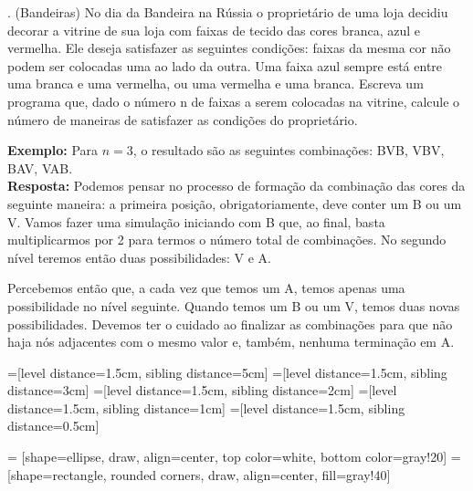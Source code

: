 
. (Bandeiras) No dia da Bandeira na Rússia o proprietário de uma loja decidiu decorar a vitrine de sua loja com faixas de tecido das cores branca, azul e vermelha. Ele deseja satisfazer as seguintes condições: faixas da mesma cor não podem ser colocadas uma ao lado da outra. Uma faixa azul sempre está entre uma branca e uma vermelha, ou uma vermelha e uma branca. Escreva um programa que, dado o número n de faixas a serem colocadas na vitrine, calcule o número de maneiras de satisfazer as condições do proprietário.

\textbf{Exemplo:} Para $n = 3$, o resultado são as seguintes combinações: BVB, VBV, BAV, VAB.\\[6pt]
\textbf{Resposta:} Podemos pensar no processo de formação da combinação das cores da seguinte maneira: a primeira posição, obrigatoriamente, deve conter um B ou um V. Vamos fazer uma simulação iniciando com B que, ao final, basta multiplicarmos por 2 para termos o número total de combinações. No segundo nível teremos então duas possibilidades: V e A.

Percebemos então que, a cada vez que temos um A, temos apenas uma possibilidade no nível seguinte. Quando temos um B ou um V, temos duas novas possibilidades. Devemos ter o cuidado ao finalizar as combinações para que não haja nós adjacentes com o mesmo valor e, também, nenhuma terminação em A.

=[level distance=1.5cm, sibling distance=5cm]
=[level distance=1.5cm, sibling distance=3cm]
=[level distance=1.5cm, sibling distance=2cm]
=[level distance=1.5cm, sibling distance=1cm]
=[level distance=1.5cm, sibling distance=0.5cm]

 = [shape=ellipse, draw, align=center,
                   top color=white, bottom color=gray!20]
 = [shape=rectangle, rounded corners, draw, align=center, fill=gray!40]

